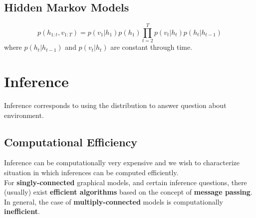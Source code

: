 \documentclass[12pt,a4paper]{article}
\begin{document}
\subsection*{Hidden Markov Models}
$$
p(h_{1:t},v_{1:T}) = p(v_1|h_1)p(h_1)\prod_{t=2}^{T}p(v_t|h_t)p(h_t|h_{t-1})
$$
where $p(h_t|h_{t-1})$ and $p(v_t|h_t)$ are constant through time.

\section*{Inference}
Inference corresponds to using the distribution to answer question about environment.
\subsection*{Computational Efficiency}
Inference can be computationally very expensive and we wish to characterize situation in which inferences can be computed efficiently.\\
For \textbf{singly-connected} graphical models, and certain inference questions, there (usually) exist \textbf{efficient algorithms} based on the concept of \textbf{message passing}.\\
In general, the case of \textbf{multiply-connected} models is computationally \textbf{inefficient}.
\end{document}
